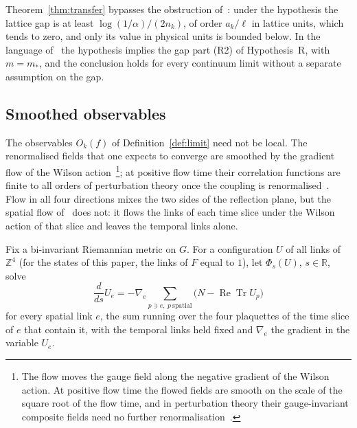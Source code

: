 \documentclass[11pt]{amsart}
\theoremstyle{definition}
\theoremstyle{remark}
\numberwithin{equation}{section}
\newcommand{\R}{\mathbb{R}}
\newcommand{\Z}{\mathbb{Z}}
\newcommand{\ReTr}{\operatorname{Re}\operatorname{Tr}}
\begin{document}
Theorem~\ref{thm:transfer} bypasses the obstruction of~\cite{BB26b}: under the hypothesis
the lattice gap is at least $\log(1/\alpha)/(2n_k)$, of order $a_k/\ell$ in
lattice units, which tends to zero, and only its value in physical units is
bounded below. In the language of~\cite{BB26b} the hypothesis implies the
gap part (R2) of Hypothesis~R, with $m=m_*$, and the conclusion holds for
every continuum limit without a separate assumption on the gap.

\subsection{Smoothed observables}

The observables $O_k(f)$ of Definition~\ref{def:limit} need not be local.
The renormalised fields that one expects to converge are smoothed by the
gradient flow of the Wilson action~\cite{Lus10}\footnote{The flow moves the gauge field along the negative gradient of the Wilson action. At positive flow time the flowed fields are smooth on the scale of the square root of the flow time, and in perturbation theory their gauge-invariant composite fields need no further renormalisation~\cite{Lus10,LW11}.}; at positive flow time their
correlation functions are finite to all orders of perturbation theory once
the coupling is renormalised~\cite{LW11}. Flow in all four directions mixes
the two sides of the reflection plane, but the spatial flow
of~\cite[Sec.~II.B]{SS23} does not: it flows the links of each time slice
under the Wilson action of that slice and leaves the temporal links alone.

Fix a bi-invariant Riemannian metric on $G$. For a configuration $U$ of all
links of $\Z^4$ (for the states of this paper, the links of $F$ equal to
$1$), let $\Phi_s(U)$, $s\in\R$, solve
\[
\frac{d}{ds}U_e=-\nabla_e\!\!\sum_{p\ni e,\ p\ \mathrm{spatial}}
\bigl(N-\ReTr U_p\bigr)
\]
for every spatial link $e$, the sum running over the four plaquettes of the
time slice of $e$ that contain it, with the temporal links held fixed and
$\nabla_e$ the gradient in the variable $U_e$.
\end{document}
